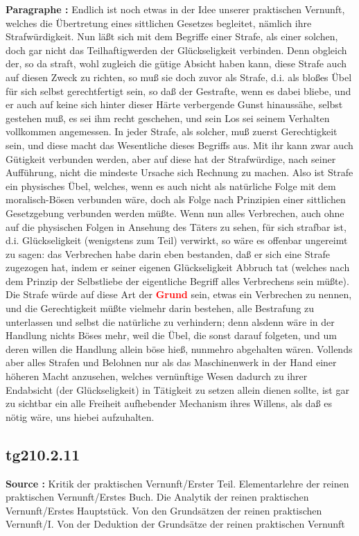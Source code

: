 \documentclass[a4paper,12pt,twoside]{book}
\newcommand{\match}[1]{\textcolor{red}{\textbf{#1}}}
\begin{document}
	\noindent\textbf{Paragraphe : }Endlich ist noch etwas in der Idee unserer praktischen Vernunft, welches die Übertretung eines sittlichen Gesetzes begleitet, nämlich ihre Strafwürdigkeit. Nun läßt sich mit dem Begriffe einer Strafe, als einer solchen, doch gar nicht das Teilhaftigwerden der Glückseligkeit verbinden. Denn obgleich der, so da straft, wohl zugleich die gütige Absicht haben kann, diese Strafe auch auf diesen Zweck zu richten, so muß sie doch zuvor als Strafe, d.i. als bloßes Übel für sich selbst gerechtfertigt sein, so daß der Gestrafte, wenn es dabei bliebe, und er auch auf keine sich hinter dieser Härte verbergende Gunst hinaussähe, selbst gestehen muß, es sei ihm recht geschehen, und sein Los sei seinem Verhalten vollkommen angemessen. In jeder Strafe, als solcher, muß zuerst Gerechtigkeit sein, und diese macht das Wesentliche dieses Begriffs aus. Mit ihr kann zwar auch Gütigkeit verbunden werden, aber auf diese hat der Strafwürdige, nach seiner Aufführung, nicht die mindeste Ursache sich Rechnung zu machen. Also ist Strafe ein physisches Übel, welches, wenn es auch nicht als natürliche Folge mit dem moralisch-Bösen verbunden wäre, doch als Folge nach Prinzipien einer sittlichen Gesetzgebung verbunden werden müßte. Wenn nun alles Verbrechen, auch ohne auf die physischen Folgen in Ansehung des Täters zu sehen, für sich strafbar ist, d.i. Glückseligkeit (wenigstens zum Teil) verwirkt, so wäre es offenbar ungereimt zu sagen: das Verbrechen habe darin eben bestanden, daß er sich eine Strafe zugezogen hat, indem er seiner eigenen Glückseligkeit Abbruch tat (welches nach dem Prinzip der Selbstliebe der eigentliche Begriff alles Verbrechens sein müßte). Die Strafe würde auf diese Art der \match{Grund} sein, etwas ein Verbrechen  zu nennen, und die Gerechtigkeit müßte vielmehr darin bestehen, alle Bestrafung zu unterlassen und selbst die natürliche zu verhindern; denn alsdenn wäre in der Handlung nichts Böses mehr, weil die Übel, die sonst darauf folgeten, und um deren willen die Handlung allein böse hieß, nunmehro abgehalten wären. Vollends aber alles Strafen und Belohnen nur als das Maschinenwerk in der Hand einer höheren Macht anzusehen, welches vernünftige Wesen dadurch zu ihrer Endabsicht (der Glückseligkeit) in Tätigkeit zu setzen allein dienen sollte, ist gar zu sichtbar ein alle Freiheit aufhebender Mechanism ihres Willens, als daß es nötig wäre, uns hiebei aufzuhalten. 
	
	\subsection*{tg210.2.11} 
	\textbf{Source : }Kritik der praktischen Vernunft/Erster Teil. Elementarlehre der reinen praktischen Vernunft/Erstes Buch. Die Analytik der reinen praktischen Vernunft/Erstes Hauptstück. Von den Grundsätzen der reinen praktischen Vernunft/I. Von der Deduktion der Grundsätze der reinen praktischen Vernunft\\  
	
\end{document}
